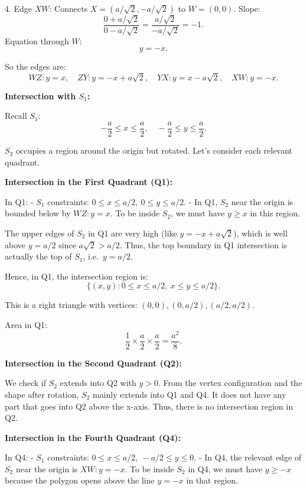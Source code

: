 \documentclass[12pt,a4paper]{article}
\begin{document}
4. Edge \(XW\): Connects \(X=(a/\sqrt{2}, -a/\sqrt{2})\) to \(W=(0,0)\).
   Slope:
   \[
   \frac{0 + a/\sqrt{2}}{0 - a/\sqrt{2}} = \frac{a/\sqrt{2}}{-a/\sqrt{2}} = -1.
   \]
   Equation through \(W\):
   \[
   y = -x.
   \]

So the edges are:
\[
WZ: y=x, \quad ZY: y=-x+a\sqrt{2}, \quad YX: y=x - a\sqrt{2}, \quad XW: y=-x.
\]

\medskip

\noindent\textbf{Intersection with \( S_1 \):}

Recall \( S_1 \):
\[
- \frac{a}{2}\le x \le \frac{a}{2}, \quad -\frac{a}{2}\le y \le \frac{a}{2}.
\]

\( S_2 \) occupies a region around the origin but rotated. Let’s consider each relevant quadrant.

\medskip

\noindent\textbf{Intersection in the First Quadrant (Q1):}

In Q1:
- \( S_1 \) constraints: \(0 \le x \le a/2,\ 0 \le y \le a/2.\)
- In Q1, \( S_2 \) near the origin is bounded below by \(WZ: y=x\). To be inside \( S_2 \), we must have \( y \ge x \) in this region.

The upper edges of \( S_2 \) in Q1 are very high (like \( y=-x+a\sqrt{2}\)), which is well above \( y=a/2 \) since \( a\sqrt{2} > a/2 \). Thus, the top boundary in Q1 intersection is actually the top of \( S_1 \), i.e.\ \( y=a/2 \).

Hence, in Q1, the intersection region is:
\[
\{(x,y): 0\le x\le a/2,\ x \le y \le a/2\}.
\]

This is a right triangle with vertices:
\((0,0), (0,a/2), (a/2,a/2)\).

Area in Q1:
\[
\frac{1}{2}\times\frac{a}{2}\times\frac{a}{2}=\frac{a^2}{8}.
\]

\medskip

\noindent\textbf{Intersection in the Second Quadrant (Q2):}

We check if \( S_2 \) extends into Q2 with \( y>0 \). From the vertex configuration and the shape after rotation, \( S_2 \) mainly extends into Q1 and Q4. It does not have any part that goes into Q2 above the x-axis. Thus, there is no intersection region in Q2.

\medskip

\noindent\textbf{Intersection in the Fourth Quadrant (Q4):}

In Q4:
- \( S_1 \) constraints: \(0 \le x \le a/2,\ -a/2 \le y \le 0.\)
- In Q4, the relevant edge of \( S_2 \) near the origin is \(XW: y=-x\). To be inside \( S_2 \) in Q4, we must have \( y \ge -x \) because the polygon opens above the line \( y=-x \) in that region.
\end{document}
